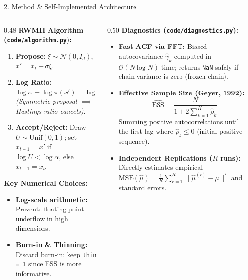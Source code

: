 \documentclass[aspectratio=169, 10pt]{beamer}
\begin{document}
\begin{frame}{2. Method \& Self-Implemented Architecture}
  \begin{columns}[T]
    \begin{column}{0.48\textwidth}
      \textbf{RWMH Algorithm (\texttt{code/algorithm.py}):}
      \begin{enumerate}
        \item \textbf{Propose:} $\xi \sim \mathcal{N}(0, I_d)$, $x' = x_t + \sigma\xi$.
        \item \textbf{Log Ratio:} $\log\alpha = \log\pi(x') - \log\pi(x_t)$\\
              \textit{(Symmetric proposal $\implies$ Hastings ratio cancels)}.
        \item \textbf{Accept/Reject:} Draw $U \sim \mathrm{Unif}(0,1)$; set $x_{t+1} = x'$ if $\log U < \log\alpha$, else $x_{t+1} = x_t$.
      \end{enumerate}
      \vspace{0.3em}
      \textbf{Key Numerical Choices:}
      \begin{itemize}
        \item \textbf{Log-scale arithmetic:} Prevents floating-point underflow in high dimensions.
        \item \textbf{Burn-in \& Thinning:} Discard burn-in; keep \texttt{thin = 1} since ESS is more informative.
      \end{itemize}
    \end{column}

    \begin{column}{0.50\textwidth}
      \textbf{Diagnostics (\texttt{code/diagnostics.py}):}
      \begin{itemize}
        \item \textbf{Fast ACF via FFT:} Biased autocovariance $\hat{\gamma}_k$ computed in $\mathcal{O}(N\log N)$ time; returns \texttt{NaN} safely if chain variance is zero (frozen chain).
        \item \textbf{Effective Sample Size (Geyer, 1992):}
        \[
          \widehat{\mathrm{ESS}} = \frac{N}{1 + 2\sum_{k=1}^{K} \hat{\rho}_k}
        \]
        Summing positive autocorrelations until the first lag where $\hat{\rho}_k \le 0$ (initial positive sequence).
        \item \textbf{Independent Replications ($R$ runs):} Directly estimates empirical $\mathrm{MSE}(\hat{\mu}) = \frac{1}{R}\sum_{r=1}^R \|\hat{\mu}^{(r)} - \mu\|^2$ and standard errors.
      \end{itemize}
    \end{column}
  \end{columns}
\end{frame}
\end{document}
